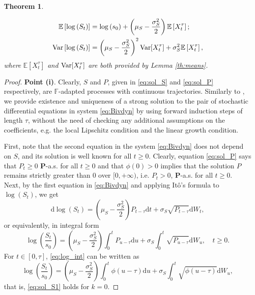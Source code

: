 \documentclass[12pt,centertags,reqno]{amsart}
\numberwithin{equation}{section} \makeatletter
\newtheorem{theorem}{Theorem}[section]
\def \P {\mathbf P}
\def \bF {\mathbb F}
\newcommand{\ud}{\mathrm d}
\newcommand{\esp}[2][\mathbb E] {#1\left[#2\right]}
\begin{document}
\begin{theorem}
\begin{itemize}
\begin{align*}
\esp{\log \left( S_t \right)} & = \log \left(s_0\right) + \left(\mu_S-\frac{\sigma_S^2}{2}\right)  \esp{X_t^\tau};\\
{\rm Var}\left[{\log \left( S_t \right)}\right] & = \left(\mu_S-\frac{\sigma_S^2}{2}\right)^2{\rm Var}[X_t^\tau]+ \sigma_S^2 \esp{X_t^\tau},
\end{align*}
where $\esp{X_t^\tau}$ and ${\rm Var}[X_t^\tau]$ are both provided by Lemma \ref{th:means}.
\end{itemize}
\end{theorem}


\begin{proof}
{\bf Point (i)}. 
Clearly, $S$ and $P$, given in \eqref{eq:sol_S} and \eqref{eq:sol_P} respectively, are $\bF$-adapted processes with continuous trajectories.
Similarly to \citet[Theorem 2.1]{mao2013delay}, we provide existence and uniqueness of a strong solution to the pair of stochastic differential equations in
system \eqref{eq:Bivdyn} by using forward induction steps of length $\tau$,
without the need of checking any additional assumptions on the coefficients, e.g. the local Lipschitz condition and the linear growth condition.

First, note that the second equation in the system \eqref{eq:Bivdyn} does not depend on $S$, and its solution is well known for all $t \ge 0$. Clearly, equation \eqref{eq:sol_P} says that $P_t \ge 0$ $\P$-a.s. for all $t \ge 0$ and that $\phi(0) > 0$ implies that the solution $P$ remains strictly greater than $0$ over $[0,+\infty)$, i.e. $P_t > 0$, $\P$-a.s. for all $t \ge 0$.\\
Next, by the first equation in 
\eqref{eq:Bivdyn} and applying It\^o’s formula to $\log \left(S_t\right)$, we get
\begin{equation} \label{eq:logS}
\ud\log \left(S_t\right) =\left(\mu_S-\frac{\sigma_S^2}{2}\right)P_{t-\tau} \ud t + \sigma_S\sqrt{P_{t-\tau}} \ud W_t,
\end{equation}
or equivalently, in integral form
\begin{equation} \label{eq:log_int}
\log\left(\frac{S_{t}}{s_{0}}\right) = \left(\mu_S-\frac{\sigma_S^2}{2}\right)\int_0^t P_{u-\tau} \ud u + \sigma_S\int_0^t\sqrt{P_{u-\tau}} \ud W_u,\quad t \ge 0.
\end{equation}
For $t \in [0,\tau]$, \eqref{eq:log_int} can be written as
\begin{equation} \label{eq:log1}
\log\left(\frac{S_{t}}{s_{0}}\right) = \left(\mu_S-\frac{\sigma_S^2}{2}\right)\int_0^t \phi \left(u-\tau \right) \ud u + \sigma_S\int_0^t\sqrt{\phi \left(u-\tau \right)} \ud W_u,
\end{equation}
that is, \eqref{eq:sol_S1} holds for $k = 0$.


\end{proof}
\end{document}
